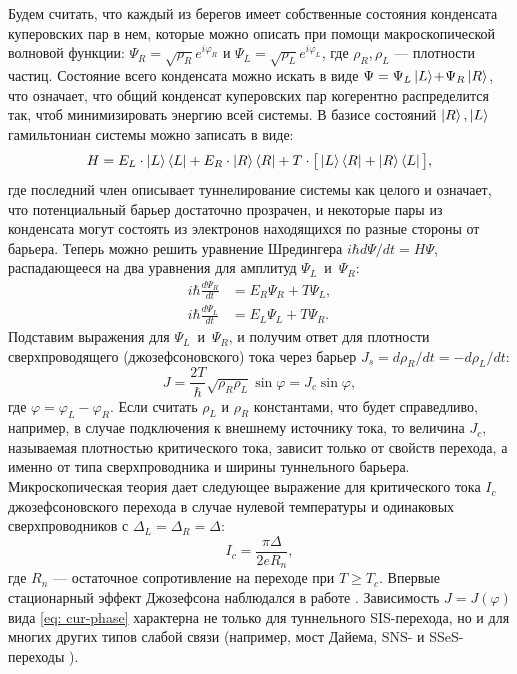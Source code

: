 Будем считать, что каждый из берегов имеет собственные состояния конденсата куперовских пар в нем, которые можно описать при помощи макроскопической волновой функции: $\Psi_R\! =\! \sqrt{\rho_R}e^{i\varphi_R}$ и $\Psi_L \!=\! \sqrt{\rho_L}
e^{i\varphi_L}$, где $\rho_R, \rho_L$ --- плотности частиц. Состояние всего конденсата можно искать в виде $\Psi = \Psi_L\ket{L}\!+\!\Psi_R\ket{R}$, что означает, что общий конденсат куперовских пар когерентно распределится так, чтоб минимизировать энергию всей системы. В базисе состояний $\ket{R}, \ket{L}$ гамильтониан системы можно записать в виде:
\begin{equation}
H = E_L\cdot \ket{L}\bra{L} + E_R\cdot \ket{R}\bra{R} + T\cdot\big[ \ket{L} \bra{R}+\ket{R}\bra{L}\big],
\end{equation}
где последний член описывает туннелирование системы как целого и означает, что потенциальный барьер достаточно прозрачен, и некоторые пары из конденсата могут состоять из электронов находящихся по разные стороны от барьера. Теперь можно решить уравнение Шредингера $i\hbar d\Psi/dt\! =\! H\Psi$, распадающееся на два уравнения для амплитуд $\Psi_L$~и~$\Psi_R$: 
\begin{align}
	i\hbar \frac{d\Psi_R}{dt} & =E_R\Psi_R+T\Psi_L, \nonumber \\
    i\hbar \frac{d\Psi_L}{dt} & =E_L\Psi_L+T\Psi_R.
    \label{eq: je_deriv}
\end{align} 
Подставим выражения для $\Psi_L$~и~$\Psi_R$, и получим ответ для плотности сверхпроводящего (джозефсоновского) тока через барьер $J_s={d\rho_R}/{dt}=-{d\rho_L}/{dt}$:
\vspace{-1pt}
\begin{equation}
J=\frac{2T}{\hbar}\sqrt{\rho_R \rho_L}\sin \varphi = J_c \sin \varphi,
\label{eq: cur-phase}
\end{equation}
где $\varphi = \varphi_L-\varphi_R$. Если считать $\rho_L$ и $\rho_R$ константами, что будет справедливо, например, в случае подключения к внешнему источнику тока, то величина $J_c$, называемая плотностью критического тока, зависит только от свойств перехода, а именно от типа сверхпроводника и ширины туннельного барьера. Микроскопическая теория дает следующее выражение для критического тока $I_c$ джозефсоновского перехода в случае нулевой температуры и одинаковых сверхпроводников с $\Delta_L=\Delta_R=\Delta$:
\begin{equation}
I_c = \frac{\pi \Delta}{2eR_n},
\end{equation}
где $R_n$ --- остаточное сопротивление на переходе при $T \ge T_c$. Впервые стационарный эффект Джозефсона наблюдался в работе \cite{StatJosephsonExp}.
Зависимость $J=J(\varphi)$ вида \eqref{eq: cur-phase} характерна не только для туннельного SIS-перехода, но и для многих других типов слабой связи (например, мост Дайема, SNS- и SSeS-переходы \cite{LikharevWL, CPhiR_review}). 
